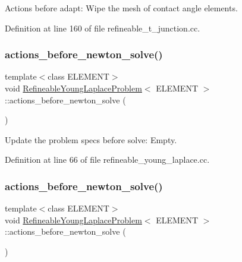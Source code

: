 Actions before adapt\+: Wipe the mesh of contact angle elements. 



Definition at line 160 of file refineable\+\_\+t\+\_\+junction.\+cc.

\mbox{\label{classRefineableYoungLaplaceProblem_a2807bb8cddbfa553df9f5dd170c8645d}} 
\subsubsection{\texorpdfstring{actions\+\_\+before\+\_\+newton\+\_\+solve()}{actions\_before\_newton\_solve()}\hspace{0.1cm}{\footnotesize\ttfamily [1/2]}}
{\footnotesize\ttfamily template$<$class E\+L\+E\+M\+E\+NT$>$ \\
void \hyperlink{classRefineableYoungLaplaceProblem}{Refineable\+Young\+Laplace\+Problem}$<$ E\+L\+E\+M\+E\+NT $>$\+::actions\+\_\+before\+\_\+newton\+\_\+solve (\begin{DoxyParamCaption}{ }\end{DoxyParamCaption})\hspace{0.3cm}{\ttfamily [inline]}}



Update the problem specs before solve\+: Empty. 



Definition at line 66 of file refineable\+\_\+young\+\_\+laplace.\+cc.

\mbox{\label{classRefineableYoungLaplaceProblem_a2807bb8cddbfa553df9f5dd170c8645d}} 
\subsubsection{\texorpdfstring{actions\+\_\+before\+\_\+newton\+\_\+solve()}{actions\_before\_newton\_solve()}\hspace{0.1cm}{\footnotesize\ttfamily [2/2]}}
{\footnotesize\ttfamily template$<$class E\+L\+E\+M\+E\+NT$>$ \\
void \hyperlink{classRefineableYoungLaplaceProblem}{Refineable\+Young\+Laplace\+Problem}$<$ E\+L\+E\+M\+E\+NT $>$\+::actions\+\_\+before\+\_\+newton\+\_\+solve (\begin{DoxyParamCaption}{ }\end{DoxyParamCaption})\hspace{0.3cm}{\ttfamily [inline]}}



